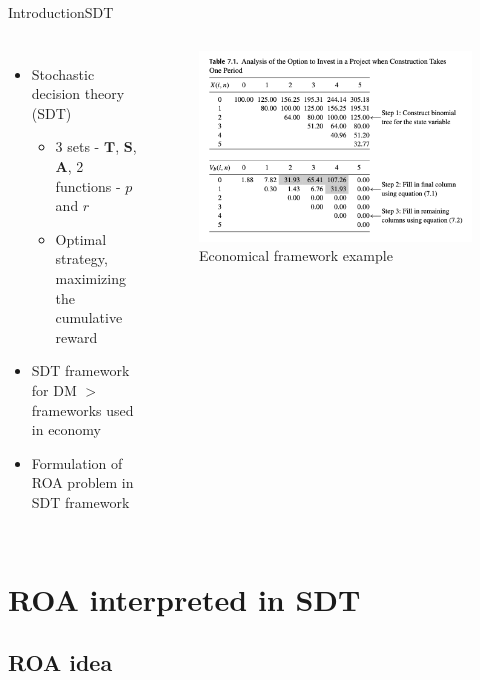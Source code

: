 \documentclass[us]{beamer}
\begin{document}
\begin{frame}{Introduction}{SDT}

\begin{columns}
	\begin{itemize}
		\item {Stochastic decision theory (SDT)}
		\begin{itemize}
			\item {3 sets - $\mathbf{T}$, $\mathbf{S}$, $\mathbf{A}$, 2 functions - $p$ and $r$}
			\item {Optimal strategy, maximizing the cumulative reward}
		\end{itemize}
		
		\item {SDT framework for DM $>$ frameworks used in economy}
		\item {Formulation of ROA problem in SDT framework}
	\end{itemize}	
	\begin{figure}
		\includegraphics[scale=0.35]{figures/Guthrie.png}
		\caption{Economical framework example \cite{Gut:09}}
	\end{figure}
\end{columns}	

\end{frame}




\section{ROA interpreted in SDT}

\subsection{ROA idea}
\end{document}
